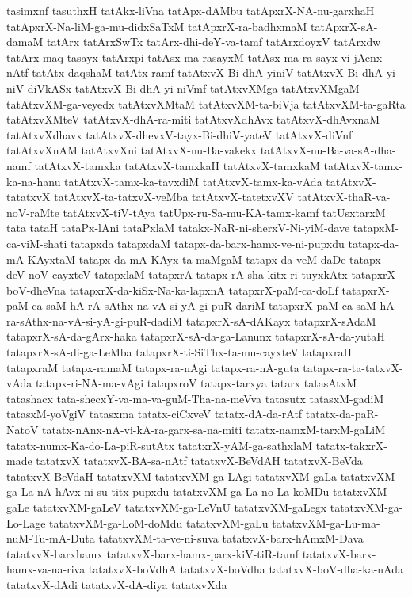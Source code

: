 {tasimxnf
tasuthxH
tatAkx-liVna
tatApx-dAMbu
tatApxrX-NA-nu-garxhaH
tatApxrX-Na-liM-ga-mu-didxSaTxM
tatApxrX-ra-badhxmaM
tatApxrX-sA-damaM
tatArx
tatArxSwTx
tatArx-dhi-deY-va-tamf
tatArxdoyxV
tatArxdw
tatArx-maq-tasayx
tatArxpi
tatAsx-ma-rasayxM
tatAsx-ma-ra-sayx-vi-jAcnx-nAtf
tatAtx-daqshaM
tatAtx-ramf
tatAtxvX-Bi-dhA-yiniV
tatAtxvX-Bi-dhA-yi-niV-diVkASx
tatAtxvX-Bi-dhA-yi-niVmf
tatAtxvXMga
tatAtxvXMgaM
tatAtxvXM-ga-veyedx
tatAtxvXMtaM
tatAtxvXM-ta-biVja
tatAtxvXM-ta-gaRta
tatAtxvXMteV
tatAtxvX-dhA-ra-miti
tatAtxvXdhAvx
tatAtxvX-dhAvxnaM
tatAtxvXdhavx
tatAtxvX-dhevxV-tayx-Bi-dhiV-yateV
tatAtxvX-diVnf
tatAtxvXnAM
tatAtxvXni
tatAtxvX-nu-Ba-vakekx
tatAtxvX-nu-Ba-va-sA-dha-namf
tatAtxvX-tamxka
tatAtxvX-tamxkaH
tatAtxvX-tamxkaM
tatAtxvX-tamx-ka-na-hanu
tatAtxvX-tamx-ka-tavxdiM
tatAtxvX-tamx-ka-vAda
tatAtxvX-tatatxvX
tatAtxvX-ta-tatxvX-veMba
tatAtxvX-tatetxvXV
tatAtxvX-thaR-va-noV-raMte
tatAtxvX-tiV-tAya
tatUpx-ru-Sa-mu-KA-tamx-kamf
tatUsxtarxM
tata
tataH
tataPx-lAni
tataPxlaM
tatakx-NaR-ni-sherxV-Ni-yiM-dave
tatapxM-ca-viM-shati
tatapxda
tatapxdaM
tatapx-da-barx-hamx-ve-ni-pupxdu
tatapx-da-mA-KAyxtaM
tatapx-da-mA-KAyx-ta-maMgaM
tatapx-da-veM-daDe
tatapx-deV-noV-cayxteV
tatapxlaM
tatapxrA
tatapx-rA-sha-kitx-ri-tuyxkAtx
tatapxrX-boV-dheVna
tatapxrX-da-kiSx-Na-ka-lapxnA
tatapxrX-paM-ca-doLf
tatapxrX-paM-ca-saM-hA-rA-sAthx-na-vA-si-yA-gi-puR-dariM
tatapxrX-paM-ca-saM-hA-ra-sAthx-na-vA-si-yA-gi-puR-dadiM
tatapxrX-sA-dAKayx
tatapxrX-sAdaM
tatapxrX-sA-da-gArx-haka
tatapxrX-sA-da-ga-Lanunx
tatapxrX-sA-da-yutaH
tatapxrX-sA-di-ga-LeMba
tatapxrX-ti-SiThx-ta-mu-cayxteV
tatapxraH
tatapxraM
tatapx-ramaM
tatapx-ra-nAgi
tatapx-ra-nA-guta
tatapx-ra-ta-tatxvX-vAda
tatapx-ri-NA-ma-vAgi
tatapxroV
tatapx-tarxya
tatarx
tatasAtxM
tatashacx
tata-shecxY-va-ma-va-guM-Tha-na-meVva
tatasutx
tatasxM-gadiM
tatasxM-yoVgiV
tatasxma
tatatx-ciCxveV
tatatx-dA-da-rAtf
tatatx-da-paR-NatoV
tatatx-nAnx-nA-vi-kA-ra-garx-sa-na-miti
tatatx-namxM-tarxM-gaLiM
tatatx-numx-Ka-do-La-piR-sutAtx
tatatxrX-yAM-ga-sathxlaM
tatatx-takxrX-made
tatatxvX
tatatxvX-BA-sa-nAtf
tatatxvX-BeVdAH
tatatxvX-BeVda
tatatxvX-BeVdaH
tatatxvXM
tatatxvXM-ga-LAgi
tatatxvXM-gaLa
tatatxvXM-ga-La-nA-hAvx-ni-su-titx-pupxdu
tatatxvXM-ga-La-no-La-koMDu
tatatxvXM-gaLe
tatatxvXM-gaLeV
tatatxvXM-ga-LeVnU
tatatxvXM-gaLegx
tatatxvXM-ga-Lo-Lage
tatatxvXM-ga-LoM-doMdu
tatatxvXM-gaLu
tatatxvXM-ga-Lu-ma-nuM-Tu-mA-Duta
tatatxvXM-ta-ve-ni-suva
tatatxvX-barx-hAmxM-Dava
tatatxvX-barxhamx
tatatxvX-barx-hamx-parx-kiV-tiR-tamf
tatatxvX-barx-hamx-va-na-riva
tatatxvX-boVdhA
tatatxvX-boVdha
tatatxvX-boV-dha-ka-nAda
tatatxvX-dAdi
tatatxvX-dA-diya
tatatxvXda
}
